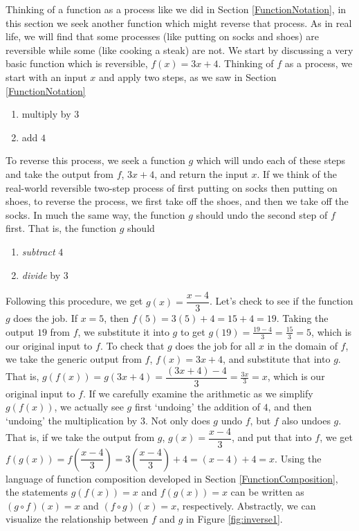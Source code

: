 \label{InverseFunctions}

Thinking of a function as a process like we did in Section \ref{FunctionNotation}, in this section we seek another function which might reverse that process.  As in real life, we will find that some processes (like putting on socks and shoes) are reversible while some (like cooking a steak) are not.  We start by discussing a very basic function which is reversible, $f(x) = 3x+4$.  Thinking of $f$ as a process, we start with an input $x$ and apply two steps, as we saw in Section \ref{FunctionNotation} 

\begin{enumerate}

\item multiply by $3$ 

\item add $4$ 

\end{enumerate}

To reverse this process, we seek a function $g$ which will undo each of these steps and take the output from $f$, $3x+4$, and return the input $x$.  If we think of the real-world reversible two-step process of first putting on socks then putting on shoes, to reverse the process, we first take off the shoes, and then we take off the socks.  In much the same way, the function $g$ should undo the second step of $f$ first.  That is, the function $g$ should

\begin{enumerate}

\item  \textit{subtract} $4$ 

\item  \textit{divide} by $3$

\end{enumerate}

Following this procedure,   we get $g(x) = \dfrac{x-4}{3}$.  Let's check to see if the function $g$ does the job.  If $x=5$, then $f(5) = 3(5)+4 = 15+4 = 19$.  Taking the output $19$ from $f$, we substitute it into $g$ to get $g(19) = \frac{19-4}{3} = \frac{15}{3} = 5$, which is our original input to $f$. To check that $g$ does the job for all $x$ in the domain of $f$, we take the generic output from $f$, $f(x) = 3x+4$, and substitute that into $g$.  That is, $g(f(x)) = g(3x+4) = \dfrac{(3x+4)-4}{3} = \frac{3x}{3} = x$, which is our original input to $f$.  If we carefully examine the arithmetic as we simplify $g(f(x))$, we actually see $g$ first `undoing' the addition of $4$, and then `undoing' the multiplication by $3$.  Not only does $g$ undo $f$, but $f$ also undoes $g$.  That is, if we take the output from $g$, $g(x) = \dfrac{x-4}{3}$, and put that into $f$, we get $f(g(x)) = f\left(\dfrac{x-4}{3}\right) = 3 \left(\dfrac{x-4}{3}\right) + 4 = (x-4) + 4 = x$.  Using the language of function composition developed in Section \ref{FunctionComposition}, the statements $g(f(x)) = x$ and $f(g(x)) = x$ can be written as $(g \circ f)(x) = x$ and $(f \circ g)(x) = x$, respectively.   Abstractly, we can visualize the relationship between $f$ and $g$ in Figure \ref{fig:inverse1}.

